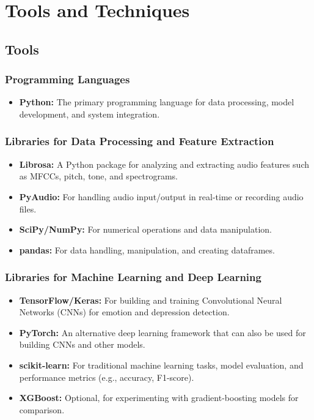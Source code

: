 
\chapter{Tools and Techniques}

\section{Tools}

\subsection{Programming Languages}
\begin{itemize}
    \item \textbf{Python:} The primary programming language for data processing, model development, and system integration.
\end{itemize}

\subsection{Libraries for Data Processing and Feature Extraction}
\begin{itemize}
    \item \textbf{Librosa:} A Python package for analyzing and extracting audio features such as MFCCs, pitch, tone, and spectrograms.
    \item \textbf{PyAudio:} For handling audio input/output in real-time or recording audio files.
    \item \textbf{SciPy/NumPy:} For numerical operations and data manipulation.
    \item \textbf{pandas:} For data handling, manipulation, and creating dataframes.
\end{itemize}

\subsection{Libraries for Machine Learning and Deep Learning}
\begin{itemize}
    \item \textbf{TensorFlow/Keras:} For building and training Convolutional Neural Networks (CNNs) for emotion and depression detection.
    \item \textbf{PyTorch:} An alternative deep learning framework that can also be used for building CNNs and other models.
    \item \textbf{scikit-learn:} For traditional machine learning tasks, model evaluation, and performance metrics (e.g., accuracy, F1-score).
    \item \textbf{XGBoost:} Optional, for experimenting with gradient-boosting models for comparison.
\end{itemize}

